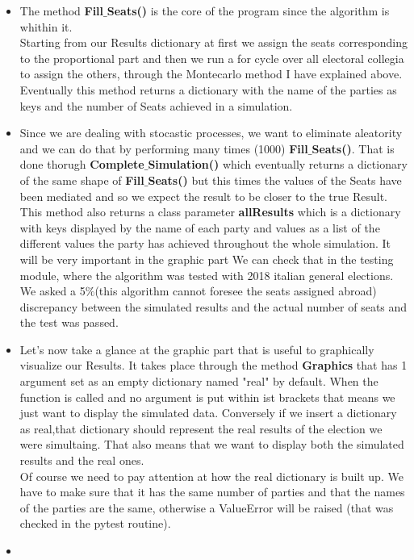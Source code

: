 \documentclass[12pt,a4paper,openright]{report}
\begin{document}
\begin{itemize}
\item
The method \textbf{Fill$\_$Seats()} is the core of the program since the algorithm is whithin it.\\ Starting from our Results dictionary at first we assign the seats corresponding to the proportional part and then we run a for cycle over all electoral collegia to assign the others, through the Montecarlo method I have explained above. Eventually this method returns a dictionary with the name of the parties as keys and the number of Seats achieved in a simulation.\\
\item Since we are dealing with stocastic processes, we want to eliminate aleatority and we can do that by performing many times (1000)  \textbf{Fill$\_$Seats()}. That is done thorugh \textbf{Complete$\_$Simulation()} which eventually returns a dictionary of the same shape of \textbf{Fill$\_$Seats()} but this times the values of the Seats have been mediated and so we expect the result to be closer to the true Result.\\
This method also returns a class parameter \textbf{allResults} which is a dictionary with keys displayed by the name of each party and values as a list of the different values the party has achieved throughout the whole simulation. It will be very important in the graphic part
We can check that in the testing module, where the algorithm was tested with 2018 italian general elections. We asked a 5$\%$(this algorithm cannot foresee the seats assigned abroad) discrepancy between the simulated results and the actual number of seats and the test was passed.
\item
Let's now take a glance at the graphic part that is useful to graphically visualize our Results. It takes place through the method \textbf{Graphics} that has 1 argument set as an empty dictionary named "real" by default. When the function is called and no argument is put within ist brackets that means we just want to display the simulated data. Conversely if we insert a dictionary as real,that dictionary should represent the real results of the election we were simultaing. That also means that  we want to display both the simulated results and the real ones.\\
Of course we need to pay attention at how the real dictionary is built up. We have to make sure that it has the same number of parties and that the names of the parties are the same, otherwise a ValueError will be raised (that was checked in the pytest routine).
\item

\end{itemize}
\end{document}
